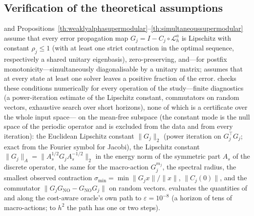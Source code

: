 \begin{table}[H]
\color{red}
\centering
\caption{Development (seed $72$, numpy/scipy sweeps, one timed replay) versus confirmatory (seed $73$, compiled kernels, three timed replays) paired median speedups of the learned router, for every pairwise cell at $\varepsilon = h^2$ against HINTS ($\tau{=}25$, the reference of the development runs) and against the best fixed schedule available in that run, and for every nested ensemble at $10^{-8}$ in work units against the best single-member router and against its oracle; two-sided Wilcoxon $p$-values in parentheses, censoring classes as in the speed tables; bold: ratio $\ge 1.1\times$ and significant after a Holm correction over the table.}
\resizebox{\textwidth}{!}{\caheldout}
\label{tab:ca_heldout}
\end{table}

\subsection{Verification of the theoretical assumptions} \label{sec:wallclock_assumptions}

 and Propositions~\ref{th:weaklyalphasupermodular}--\ref{th:simultaneoussupermodular} assume that every error propagation map $G_j = I - C_j\circ\mathcal{L}_h^a$ is Lipschitz with constant $\rho_j \le 1$ (with at least one strict contraction in the optimal sequence, respectively a shared unitary eigenbasis), zero-preserving, and---for postfix monotonicity---simultaneously diagonalisable by a unitary matrix;  assumes that at every state at least one solver leaves a positive fraction of the error.  checks these conditions numerically for every operation of the study---finite diagnostics (a power-iteration estimate of the Lipschitz constant, commutators on random vectors, exhaustive search over short horizons), none of which is a certificate over the whole input space--- on the mean-free subspace (the constant mode is the null space of the periodic operator and is excluded from the data and from every iteration): the Euclidean Lipschitz constant $\|G_j\|_2$ (power iteration on $G_j^{\top}G_j$; exact from the Fourier symbol for Jacobi), the Lipschitz constant $\|G_j\|_A = \|A_s^{1/2} G_j A_s^{-1/2}\|_2$ in the energy norm of the symmetric part $A_s$ of the discrete operator, the same for the macro-action $G_j^{m_j}$, the spectral radius, the smallest observed contraction $\sigma_{\min} = \min\|G_j x\|/\|x\|$, $\|C_j(0)\|$, and the commutator $\|G_j G_{\mathrm{NO}} - G_{\mathrm{NO}} G_j\|$ on random vectors.  evaluates the quantities of  and  along the cost-aware oracle's own path to $\varepsilon = 10^{-8}$ (a horizon of tens of macro-actions; to $h^2$ the path has one or two steps).

